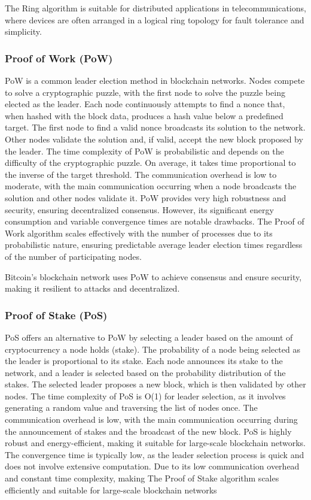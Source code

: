 The Ring algorithm is suitable for distributed applications in telecommunications, where devices are often arranged in a logical ring topology for fault tolerance and simplicity.

\subsubsection{Proof of Work (PoW)}

PoW is a common leader election method in blockchain networks. Nodes compete to solve a cryptographic puzzle, with the first node to solve the puzzle being elected as the leader. Each node continuously attempts to find a nonce that, when hashed with the block data, produces a hash value below a predefined target. The first node to find a valid nonce broadcasts its solution to the network. Other nodes validate the solution and, if valid, accept the new block proposed by the leader.
The time complexity of PoW is probabilistic and depends on the difficulty of the cryptographic puzzle. On average, it takes time proportional to the inverse of the target threshold. The communication overhead is low to moderate, with the main communication occurring when a node broadcasts the solution and other nodes validate it. PoW provides very high robustness and security, ensuring decentralized consensus. However, its significant energy consumption and variable convergence times are notable drawbacks. The Proof of Work algorithm scales effectively with the number of processes due to its probabilistic nature, ensuring predictable average leader election times regardless of the number of participating nodes.

Bitcoin's blockchain network uses PoW to achieve consensus and ensure security, making it resilient to attacks and decentralized.

\subsubsection{Proof of Stake (PoS)}

PoS offers an alternative to PoW by selecting a leader based on the amount of cryptocurrency a node holds (stake). The probability of a node being selected as the leader is proportional to its stake. Each node announces its stake to the network, and a leader is selected based on the probability distribution of the stakes. The selected leader proposes a new block, which is then validated by other nodes.
The time complexity of PoS is O(1) for leader selection, as it involves generating a random value and traversing the list of nodes once. The communication overhead is low, with the main communication occurring during the announcement of stakes and the broadcast of the new block. PoS is highly robust and energy-efficient, making it suitable for large-scale blockchain networks. The convergence time is typically low, as the leader selection process is quick and does not involve extensive computation.
Due to its low communication overhead and constant time complexity, making The Proof of Stake algorithm scales efficiently and suitable for large-scale blockchain networks 


